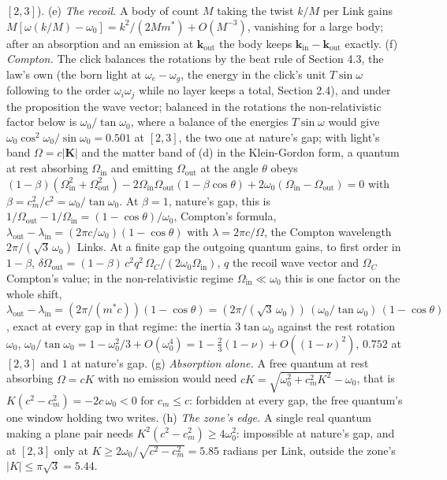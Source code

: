 \begin{derivation}
$[2, 3]$). (e) \emph{The recoil.} A body of count $M$ taking the twist $k / M$ per Link gains $M[\omega(k / M) - \omega_0] = k^2 / (2Mm^*) + O(M^{-3})$, vanishing for a large body; after an absorption and an emission at $\mathbf k_{\mathrm{out}}$ the body keeps $\mathbf k_{\mathrm{in}} - \mathbf k_{\mathrm{out}}$ exactly. (f) \emph{Compton.} The click balances the rotations by the beat rule of Section 4.3, the law's own (the born light at $\omega_e - \omega_g$, the energy in the click's unit $T\sin\omega$ following to the order $\omega_i\omega_j$ while no layer keeps a total, Section 2.4), and under the proposition the wave vector; balanced in the rotations the non-relativistic factor below is $\omega_0 / \tan\omega_0$, where a balance of the energies $T\sin\omega$ would give $\omega_0\cos^2\omega_0 / \sin\omega_0 = 0.501$ at $[2, 3]$, the two one at nature's gap; with light's band $\Omega = c|\mathbf K|$ and the matter band of (d) in the Klein-Gordon form, a quantum at rest absorbing $\Omega_{\mathrm{in}}$ and emitting $\Omega_{\mathrm{out}}$ at the angle $\theta$ obeys $(1 - \beta)(\Omega_{\mathrm{in}}^2 + \Omega_{\mathrm{out}}^2) - 2\Omega_{\mathrm{in}}\Omega_{\mathrm{out}}(1 - \beta\cos\theta) + 2\omega_0(\Omega_{\mathrm{in}} - \Omega_{\mathrm{out}}) = 0$ with $\beta = c_m^2 / c^2 = \omega_0 / \tan\omega_0$. At $\beta = 1$, nature's gap, this is $1 / \Omega_{\mathrm{out}} - 1 / \Omega_{\mathrm{in}} = (1 - \cos\theta) / \omega_0$, Compton's formula, $\lambda_{\mathrm{out}} - \lambda_{\mathrm{in}} = (2\pi c / \omega_0)(1 - \cos\theta)$ with $\lambda = 2\pi c / \Omega$, the Compton wavelength $2\pi / (\sqrt 3\,\omega_0)$ Links. At a finite gap the outgoing quantum gains, to first order in $1 - \beta$, $\delta\Omega_{\mathrm{out}} = (1 - \beta)\,c^2 q^2\,\Omega_C / (2\omega_0\Omega_{\mathrm{in}})$, $q$ the recoil wave vector and $\Omega_C$ Compton's value; in the non-relativistic regime $\Omega_{\mathrm{in}} \ll \omega_0$ this is one factor on the whole shift, $\lambda_{\mathrm{out}} - \lambda_{\mathrm{in}} = (2\pi / (m^* c))(1 - \cos\theta) = (2\pi / (\sqrt 3\,\omega_0))\,(\omega_0 / \tan\omega_0)\,(1 - \cos\theta)$, exact at every gap in that regime: the inertia $3\tan\omega_0$ against the rest rotation $\omega_0$, $\omega_0 / \tan\omega_0 = 1 - \omega_0^2 / 3 + O(\omega_0^4) = 1 - \tfrac23(1 - \nu) + O((1 - \nu)^2)$, $0.752$ at $[2, 3]$ and $1$ at nature's gap. (g) \emph{Absorption alone.} A free quantum at rest absorbing $\Omega = cK$ with no emission would need $cK = \sqrt{\omega_0^2 + c_m^2 K^2} - \omega_0$, that is $K(c^2 - c_m^2) = -2c\,\omega_0 < 0$ for $c_m \le c$: forbidden at every gap, the free quantum's one window holding two writes. (h) \emph{The zone's edge.} A single real quantum making a plane pair needs $K^2(c^2 - c_m^2) \ge 4\omega_0^2$: impossible at nature's gap, and at $[2, 3]$ only at $K \ge 2\omega_0 / \sqrt{c^2 - c_m^2} = 5.85$ radians per Link, outside the zone's $|K| \le \pi\sqrt 3 = 5.44$.

\end{derivation}
